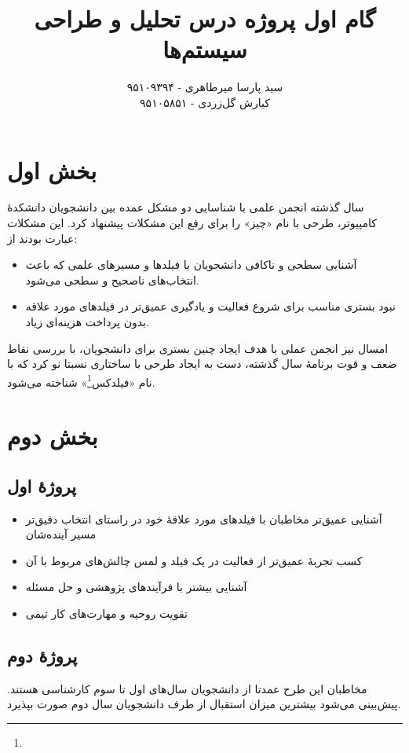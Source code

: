 \documentclass{article}
\title{\textbf{گام اول پروژه درس تحلیل و طراحی سیستم‌ها}}
\author{سید پارسا میرطاهری - ۹۵۱۰۹۳۹۴ \\ کیارش گل‌زردی - ۹۵۱۰۵۸۵۱}
\begin{document}
\date{}

\maketitle

\section{بخش اول}
سال گذشته انجمن علمی با شناسایی دو مشکل عمده بین دانشجویان دانشکدهٔ کامپیوتر، طرحی با نام «چیز» را برای رفع این مشکلات پیشنهاد کرد. این مشکلات عبارت بودند از:
\begin{itemize}
\item
آشنایی سطحی و ناکافی دانشجویان با فیلدها و مسیرهای علمی که باعث انتخاب‌های ناصحیح و سطحی می‌شود. 
\item
نبود بستری مناسب برای شروع فعالیت و یادگیری عمیق‌تر در فیلدهای مورد علاقه بدون پرداخت هزینه‌ای زیاد.
\end{itemize}
امسال نیز انجمن عملی با هدف ایجاد چنین بستری برای دانشجویان، با بررسی نقاط ضعف و قوت برنامهٔ سال گذشته، دست به ایجاد طرحی با ساختاری نسبتا نو کرد که با نام «فیلدکس\footnote{}» شناخته می‌شود.

\section{بخش دوم}
\subsection{پروژهٔ اول}
\begin{itemize}
\item
آشنایی عمیق‌تر مخاطبان با فیلدهای مورد علاقه‌ٔ خود در راستای انتخاب دقیق‌تر مسیر آینده‌شان
\item
کسب تجربه‌ٔ عمیق‌تر از فعالیت در یک فیلد و لمس چالش‌های مربوط با آن
\item
آشنایی بیشتر با فرآیندهای پژوهشی و حل مسئله
\item
تقویت روحیه‌ و مهارت‌های کار تیمی
\end{itemize}

\subsection{پروژهٔ دوم}
مخاطبان این طرح عمدتا از دانشجویان سال‌های اول تا سوم کارشناسی هستند. پیش‌بینی می‌شود بیشترین میزان استقبال از طرف دانشجویان سال دوم صورت بپذیرد.
\end{document}
